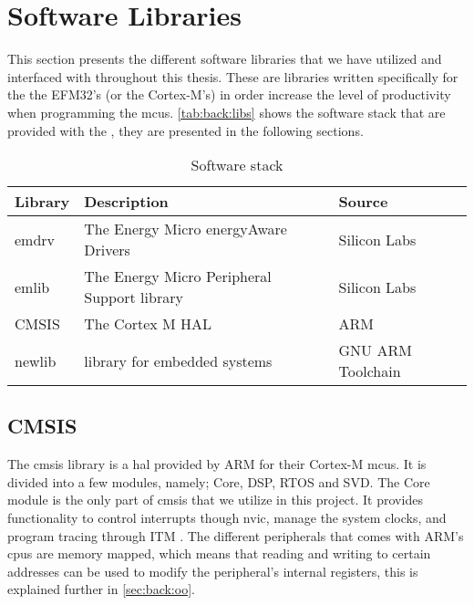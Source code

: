 
\section{Software Libraries}
\label{sec:back:lib}

This section presents the different software libraries that we have utilized and interfaced with throughout this thesis.
These are libraries written specifically for the the EFM32's (or the Cortex-M's) in order increase the level of productivity when programming the \glspl{mcu}.
\autoref{tab:back:libs} shows the software stack that are provided with the {\gecko}, they are presented in the following sections.

\begin{table}[H]
  \begin{tabular}{l|l|l}
    \textbf{Library} & \textbf{Description} & \textbf{Source} \\
    \hline
    emdrv & The Energy Micro energyAware Drivers & Silicon Labs \\
    emlib & The Energy Micro Peripheral Support library & Silicon Labs \\
    CMSIS & The Cortex M HAL & ARM \\
    newlib & {\C} library for embedded systems & GNU ARM Toolchain \\
    \hline
  \end{tabular}
  \caption{Software stack}
  \label{tab:back:libs}
\end{table}

\subsection{CMSIS}
\label{sub:cmsis}

The \gls{cmsis} library is a \gls{hal} provided by ARM for their Cortex-M \glspl{mcu}.
It is divided into a few modules, namely; Core, DSP, RTOS and SVD.
The Core module is the only part of \gls{cmsis} that we utilize in this project.
It provides functionality to control interrupts though \gls{nvic}, manage the system clocks, and program tracing through ITM .
The different peripherals that comes with ARM's \glspl{cpu} are memory mapped, which means that reading and writing to certain addresses can be used to modify the peripheral's internal registers, this is explained further in \autoref{sec:back:oo}.


